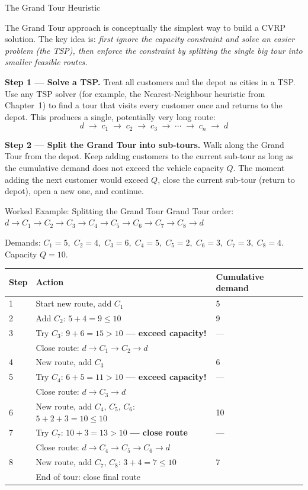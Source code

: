 \documentclass[aspectratio=169,10pt]{beamer}
\begin{document}
\begin{frame}[allowframebreaks]{The Grand Tour Heuristic}

  The Grand Tour approach is conceptually the simplest way to build a CVRP
  solution.  The key idea is: \textit{first ignore the capacity constraint and
  solve an easier problem (the TSP), then enforce the constraint by splitting
  the single big tour into smaller feasible routes.}

  \bigskip
  \textbf{Step 1 --- Solve a TSP.}  Treat all customers and the depot as
  cities in a TSP.  Use any TSP solver (for example, the Nearest-Neighbour
  heuristic from Chapter~1) to find a tour that visits every customer once
  and returns to the depot.  This produces a single, potentially very long
  route:
  \[
    d \;\to\; c_1 \;\to\; c_2 \;\to\; c_3 \;\to\; \cdots \;\to\; c_n \;\to\; d
  \]

  \textbf{Step 2 --- Split the Grand Tour into sub-tours.}  Walk along the
  Grand Tour from the depot.  Keep adding customers to the current sub-tour
  as long as the cumulative demand does not exceed the vehicle capacity $Q$.
  The moment adding the next customer would exceed $Q$, close the current
  sub-tour (return to depot), open a new one, and continue.

  \framebreak

  \begin{exampleblock}{Worked Example: Splitting the Grand Tour}
    Grand Tour order: $d \to C_1 \to C_2 \to C_3 \to C_4 \to C_5 \to C_6 \to C_7 \to C_8 \to d$

    \medskip
    Demands: $C_1{=}5,\; C_2{=}4,\; C_3{=}6,\; C_4{=}5,\; C_5{=}2,\; C_6{=}3,\; C_7{=}3,\; C_8{=}4$.
    Capacity $Q=10$.

    \medskip
    \begin{tabular}{lll}
      \toprule
      Step & Action & Cumulative demand \\
      \midrule
      1 & Start new route, add $C_1$ & 5 \\
      2 & Add $C_2$: $5+4=9 \leq 10$ & 9 \\
      3 & Try $C_3$: $9+6=15 > 10$ \textbf{--- exceed capacity!} & --- \\
        & Close route: $d \to C_1 \to C_2 \to d$ & \\
      4 & New route, add $C_3$ & 6 \\
      5 & Try $C_4$: $6+5=11 > 10$ \textbf{--- exceed capacity!} & --- \\
        & Close route: $d \to C_3 \to d$ & \\
      6 & New route, add $C_4$, $C_5$, $C_6$: $5+2+3=10 \leq 10$ & 10 \\
      7 & Try $C_7$: $10+3=13 > 10$ \textbf{--- close route} & --- \\
        & Close route: $d \to C_4 \to C_5 \to C_6 \to d$ & \\
      8 & New route, add $C_7$, $C_8$: $3+4=7 \leq 10$ & 7 \\
        & End of tour: close final route & \\
      \bottomrule
    \end{tabular}


\end{exampleblock}
\end{frame}
\end{document}
